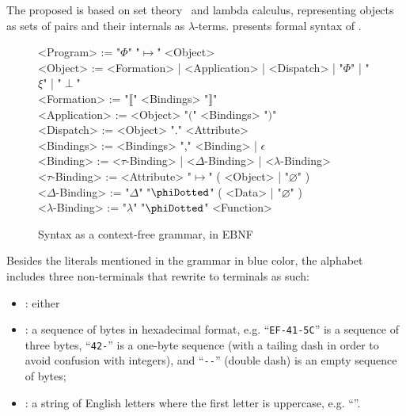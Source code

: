 
The proposed \phic{} is based on set theory~\citep{jech2013set} and lambda calculus,
representing objects as sets of pairs and their internals as \(\lambda\)-terms.
 presents formal syntax of \phic{}.

\begin{figure*}
\begin{mdframed}
\raggedright
\begin{ebnf}[8em]
<Program> := "\(\Phi\)" "\(\mapsto\)" <Object> \\
<Object> := <Formation> | <Application> | <Dispatch> | "\(\Phi\)" | "\(\xi\)" | "\(\perp\)" \\
<Formation> := "\(\llbracket\)" <Bindings> "\(\rrbracket\)" \\
<Application> := <Object> "\(\lparen\)" <Bindings> "\(\rparen\)" \\
<Dispatch> := <Object> "." <Attribute> \\
<Bindings> := <Bindings> "," <Binding> | \(\epsilon\) \\
<Binding> := <\(\tau\)-Binding> | <\(\Delta\)-Binding> | <\(\lambda\)-Binding> \\
<\(\tau\)-Binding> := <Attribute> "\(\mapsto\)" ( <Object> | "\(\varnothing\)" ) \\
<\(\Delta\)-Binding> := "\(\Delta\)" "\(\phiDotted\)" ( <Data> | "\(\varnothing\)" ) \\
<\(\lambda\)-Binding> := "\(\lambda\)" "\(\phiDotted\)" <Function> \\
\end{ebnf}
\end{mdframed}
\caption{Syntax as a context-free grammar, in EBNF}
\label{fig:ebnf}
\end{figure*}

Besides the literals mentioned in the grammar in blue color, the alphabet includes three non-terminals that rewrite to terminals as such:
\begin{itemize}
\item {}: either 
\item {}: a sequence of bytes in hexadecimal format, e.g. ``\texttt{EF-41-5C}'' is a sequence of three bytes, ``\texttt{42-}'' is a one-byte sequence (with a tailing dash in order to avoid confusion with integers), and ``\texttt{-{}-}'' (double dash) is an empty sequence of bytes;
\item {}: a string of English letters where the first letter is uppercase, e.g. ``''.
\end{itemize}

